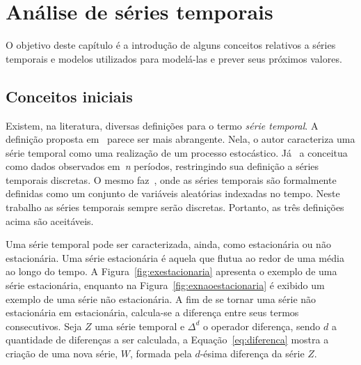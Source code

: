 \chapter{Análise de séries temporais}
\label{Capitulo:analisedeseriestemporais}

O objetivo deste capítulo é a introdução de alguns conceitos relativos a séries
temporais e modelos utilizados para modelá-las e prever seus próximos valores.

\section{Conceitos iniciais}

Existem, na literatura, diversas definições para o termo \emph{série temporal}.
A definição proposta em~\citep{Livro:analiseseriestemporais} parece ser mais
abrangente. Nela, o autor caracteriza uma série temporal como uma realização de
um processo estocástico. Já~\citep{Livro:estatisticaadmeeconomia} a conceitua
como dados observados em~\emph{n} períodos, restringindo sua definição a séries
temporais discretas. O mesmo faz~\citep{Livro:serietemporal2}, onde as séries
temporais são formalmente definidas como um conjunto de variáveis aleatórias
indexadas no tempo. Neste trabalho as séries temporais sempre serão discretas.
Portanto, as três definições acima são aceitáveis.

Uma série temporal pode ser caracterizada, ainda, como estacionária ou não
estacionária. Uma série estacionária é aquela que flutua ao redor de uma média
ao longo do tempo. A Figura~\ref{fig:exestacionaria} apresenta o exemplo de uma
série estacionária, enquanto na Figura~\ref{fig:exnaoestacionaria} é exibido um
exemplo de uma série não estacionária. A fim de se tornar uma série não
estacionária em estacionária, calcula-se a diferença entre seus termos
consecutivos. Seja $Z$ uma série temporal e $\Delta^d$ o operador diferença,
sendo $d$ a quantidade de diferenças a ser calculada, a
Equação~\ref{eq:diferenca} mostra a criação de uma nova série, $W$, formada pela
$d$-ésima diferença da série $Z$.

